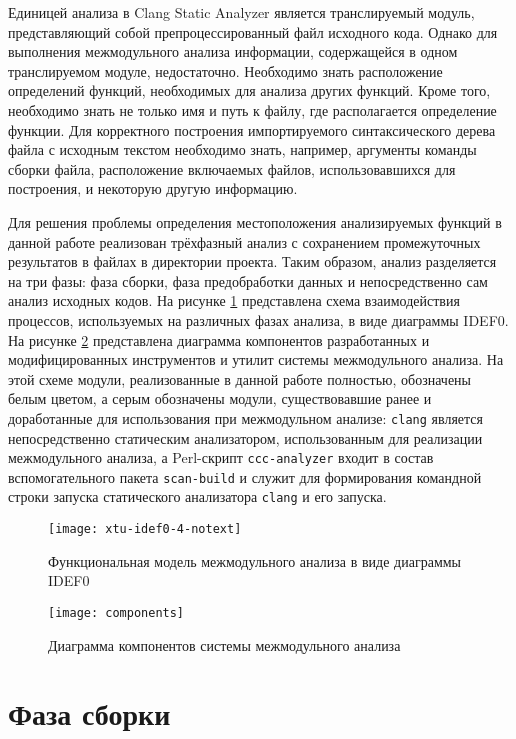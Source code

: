 Единицей анализа в Clang Static Analyzer является транслируемый модуль, представляющий собой препроцессированный файл исходного кода. Однако для выполнения межмодульного анализа информации, содержащейся в одном транслируемом модуле, недостаточно. Необходимо знать расположение определений функций, необходимых для анализа других функций. Кроме того, необходимо знать не только имя и путь к файлу, где располагается определение функции. Для корректного построения импортируемого синтаксического дерева файла с исходным текстом необходимо знать, например, аргументы команды сборки файла, расположение включаемых файлов, использовавшихся для построения, и некоторую другую информацию.

Для решения проблемы определения местоположения анализируемых функций в данной работе реализован трёхфазный анализ с сохранением промежуточных результатов в файлах в директории проекта. Таким образом, анализ разделяется на три фазы: фаза сборки, фаза предобработки данных и непосредственно сам анализ исходных кодов. На рисунке \ref{xtu-idef0} представлена схема взаимодействия процессов, используемых на различных фазах анализа, в виде диаграммы IDEF0. На рисунке \ref{components} представлена диаграмма компонентов разработанных и модифицированных инструментов и утилит системы межмодульного анализа. На этой схеме модули, реализованные в данной работе полностью, обозначены белым цветом, а серым обозначены модули, существовавшие ранее и доработанные для использования при межмодульном анализе: \texttt{clang} является непосредственно статическим анализатором, использованным для реализации межмодульного анализа, а Perl-скрипт \texttt{ccc-analyzer} входит в состав вспомогательного пакета \texttt{scan-build} и служит для формирования командной строки запуска статического анализатора \texttt{clang} и его запуска.

\begin{figure}[h]
 \label{}
 \centering
 \texttt{[image: xtu-idef0-4-notext]}
 \caption{Функциональная модель межмодульного анализа в виде диаграммы IDEF0}\label{xtu-idef0}
\end{figure}

\begin{figure}[h]
 \label{}
 \centering
 \texttt{[image: components]}
 \caption{Диаграмма компонентов системы межмодульного анализа}\label{components}
\end{figure}


\section{Фаза сборки}

